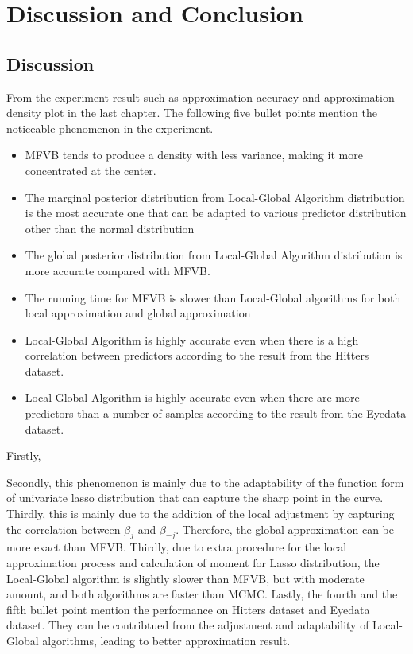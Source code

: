 \chapter{Discussion and Conclusion}

\section{Discussion}
From the experiment result such as approximation accuracy and approximation density plot in the last chapter. The following five bullet points mention the noticeable phenomenon in the experiment.
\begin{itemize}
	\item MFVB tends to produce a density with less variance, making it more concentrated at the center.
	\item The marginal posterior distribution from Local-Global Algorithm distribution is the most accurate one that can be adapted to various predictor distribution other than the normal distribution
	\item The global posterior distribution from Local-Global Algorithm distribution is more accurate compared with MFVB.
	\item The running time for MFVB is slower than Local-Global algorithms for both local approximation and global approximation
	\item Local-Global Algorithm is highly accurate even when there is a high correlation between predictors according to the result from the Hitters dataset.
	\item Local-Global Algorithm is highly accurate even when there are more predictors than a number of samples according to the result from the Eyedata dataset.
\end{itemize}
Firstly,

Secondly, this phenomenon is mainly due to the adaptability of the function form of univariate lasso distribution that can capture the sharp point in the curve.
Thirdly, this is mainly due to the addition of the local adjustment by capturing the correlation between $\beta_j$ and $\beta_{-j}$. Therefore, the global approximation can be more exact than MFVB.
Thirdly, due to extra procedure for the local approximation process and calculation of moment for Lasso distribution, the Local-Global algorithm is slightly slower than MFVB, but with moderate amount, and both algorithms are faster than MCMC.
Lastly, the fourth and the fifth bullet point mention the performance on Hitters dataset and Eyedata dataset. They can be contribtued from the adjustment and adaptability of Local-Global algorithms, leading to better approximation result.











